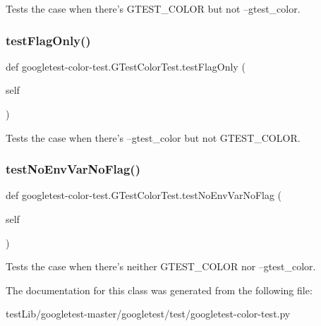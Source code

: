 \begin{DoxyVerb}Tests the case when there's GTEST_COLOR but not --gtest_color.\end{DoxyVerb}
 \mbox{\label{classgoogletest-color-test_1_1GTestColorTest_ade41e99b5486c9d947d9b817210174f6}} 
\subsubsection{\texorpdfstring{test\+Flag\+Only()}{testFlagOnly()}}
{\footnotesize\ttfamily def googletest-\/color-\/test.\+G\+Test\+Color\+Test.\+test\+Flag\+Only (\begin{DoxyParamCaption}\item[{}]{self }\end{DoxyParamCaption})}

\begin{DoxyVerb}Tests the case when there's --gtest_color but not GTEST_COLOR.\end{DoxyVerb}
 \mbox{\label{classgoogletest-color-test_1_1GTestColorTest_ae36014618c6afc19fa6d77babf8faa88}} 
\subsubsection{\texorpdfstring{test\+No\+Env\+Var\+No\+Flag()}{testNoEnvVarNoFlag()}}
{\footnotesize\ttfamily def googletest-\/color-\/test.\+G\+Test\+Color\+Test.\+test\+No\+Env\+Var\+No\+Flag (\begin{DoxyParamCaption}\item[{}]{self }\end{DoxyParamCaption})}

\begin{DoxyVerb}Tests the case when there's neither GTEST_COLOR nor --gtest_color.\end{DoxyVerb}
 

The documentation for this class was generated from the following file\+:\begin{DoxyCompactItemize}
\item 
test\+Lib/googletest-\/master/googletest/test/googletest-\/color-\/test.\+py\end{DoxyCompactItemize}
